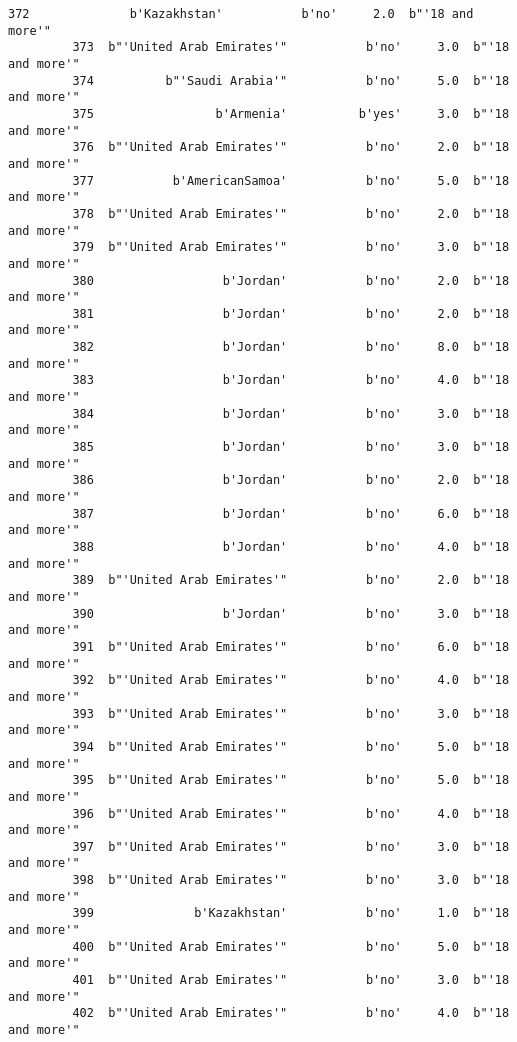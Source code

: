 \documentclass[11pt]{article}
\begin{document}
\begin{Verbatim}[commandchars=\\\{\}]
         372              b'Kazakhstan'           b'no'     2.0  b"'18 and more'"   
         373  b"'United Arab Emirates'"           b'no'     3.0  b"'18 and more'"   
         374          b"'Saudi Arabia'"           b'no'     5.0  b"'18 and more'"   
         375                 b'Armenia'          b'yes'     3.0  b"'18 and more'"   
         376  b"'United Arab Emirates'"           b'no'     2.0  b"'18 and more'"   
         377           b'AmericanSamoa'           b'no'     5.0  b"'18 and more'"   
         378  b"'United Arab Emirates'"           b'no'     2.0  b"'18 and more'"   
         379  b"'United Arab Emirates'"           b'no'     3.0  b"'18 and more'"   
         380                  b'Jordan'           b'no'     2.0  b"'18 and more'"   
         381                  b'Jordan'           b'no'     2.0  b"'18 and more'"   
         382                  b'Jordan'           b'no'     8.0  b"'18 and more'"   
         383                  b'Jordan'           b'no'     4.0  b"'18 and more'"   
         384                  b'Jordan'           b'no'     3.0  b"'18 and more'"   
         385                  b'Jordan'           b'no'     3.0  b"'18 and more'"   
         386                  b'Jordan'           b'no'     2.0  b"'18 and more'"   
         387                  b'Jordan'           b'no'     6.0  b"'18 and more'"   
         388                  b'Jordan'           b'no'     4.0  b"'18 and more'"   
         389  b"'United Arab Emirates'"           b'no'     2.0  b"'18 and more'"   
         390                  b'Jordan'           b'no'     3.0  b"'18 and more'"   
         391  b"'United Arab Emirates'"           b'no'     6.0  b"'18 and more'"   
         392  b"'United Arab Emirates'"           b'no'     4.0  b"'18 and more'"   
         393  b"'United Arab Emirates'"           b'no'     3.0  b"'18 and more'"   
         394  b"'United Arab Emirates'"           b'no'     5.0  b"'18 and more'"   
         395  b"'United Arab Emirates'"           b'no'     5.0  b"'18 and more'"   
         396  b"'United Arab Emirates'"           b'no'     4.0  b"'18 and more'"   
         397  b"'United Arab Emirates'"           b'no'     3.0  b"'18 and more'"   
         398  b"'United Arab Emirates'"           b'no'     3.0  b"'18 and more'"   
         399              b'Kazakhstan'           b'no'     1.0  b"'18 and more'"   
         400  b"'United Arab Emirates'"           b'no'     5.0  b"'18 and more'"   
         401  b"'United Arab Emirates'"           b'no'     3.0  b"'18 and more'"   
         402  b"'United Arab Emirates'"           b'no'     4.0  b"'18 and more'"   

\end{Verbatim}
\end{document}

